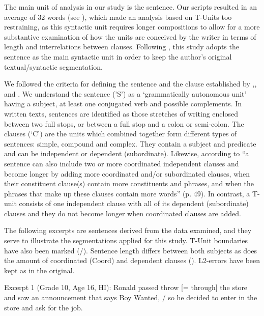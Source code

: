 \documentclass[output=paper]{langsci/langscibook}
\begin{document}
 

The main unit of analysis in our study is the sentence. Our scripts resulted in an average of 32 words (see ), which made an analysis based on T-Units \citep{Hunt1965} too restraining, as this syntactic unit requires longer compositions to allow for a more substantive examination of how the units are conceived by the writer in terms of length and interrelations between clauses. Following \citet{Bardovi-Harlig1992}, this study adopts the sentence as the main syntactic unit in order to keep the author’s original textual/syntactic segmentation. 

We followed the criteria for defining the sentence and the clause established by \citet{GreenbaumQuirk1990},\citet{Bardovi-Harlig1992}, \citet{Vyatkina2012} and \citet{BultéHousen2014}. We understand the sentence ('S') as a ‘grammatically autonomous unit’ \citep[78]{QuirkEtAl1985} having a subject, at least one conjugated verb and possible complements. In written texts, sentences are identified as those stretches of writing enclosed between two full stops, or between a full stop and a colon or semi-colon. The clauses (‘C’) are the units which combined together form different types of sentences: simple, compound and complex. They contain a subject and predicate and can be independent or dependent (subordinate). Likewise, according to \citet{BultéHousen2014} “a sentence can also include two or more coordinated independent clauses and become longer by adding more coordinated and/or subordinated clauses, when their constituent clause(s) contain more constituents and phrases, and when the phrases that make up these clauses contain more words” (p. 49).  In contrast, a T-unit consists of one independent clause with all of its dependent (subordinate) clauses and they do not become longer when coordinated clauses are added. 

The following excerpts are sentences derived from the data examined, and they serve to illustrate the segmentations applied for this study. T-Unit boundaries have also been marked (/). Sentence length differs between both subjects as does the amount of coordinated (Coord) and dependent clauses (). L2-errors have been kept as in the original.  

\ea Excerpt 1 (Grade 10, Age 16, HI):  
  \ea Ronald passed throw [= through]  the store and saw an announcement that says Boy Wanted, / so he decided to enter in the store and ask for the job. 
\end{document}

